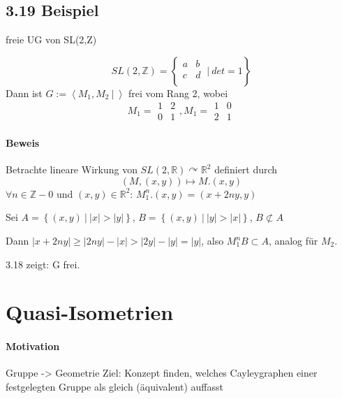 \documentclass{article}
\newcommand{\Z}{\mathbb{Z}}
\newcommand{\R}{\mathbb{R}}
\newcommand{\set}[2]{\left\lbrace #1~|~#2 \right\rbrace}
\newcommand{\grp}[2]{\left\langle #1~|~#2 \right\rangle}
\begin{document}
\subsection{3.19 Beispiel}
freie UG von SL(2,Z)

\[SL(2,\Z) = \set{\begin{matrix}
	a & b\\
	c & d\\
	\end{matrix}}{det = 1}\]
Dann ist $G:= \grp{M_1, M_2}{}$ frei vom Rang 2, wobei 
\[M_1 =\begin{matrix}
1 & 2\\
0 & 1
\end{matrix}, M_1 =\begin{matrix}
1 & 0\\
2 & 1
\end{matrix}\]

\paragraph{Beweis}
Betrachte lineare Wirkung von $SL(2,\R) \curvearrowright \R^2$ definiert durch
\[(M, (x,y)) \longmapsto M.(x,y)\]
$\forall n \in \Z - 0$ und $(x,y) \in \R^2$: $M_1^n.(x,y) = (x+2ny,y)$

Sei $A = \set{(x,y)}{|x| > |y|}$, 
 $B = \set{(x,y)}{|y| > |x|}$,  $B \not \subset A$

Dann $|x + 2ny| \geq |2ny| - |x| > |2y| - |y| = |y|$, also $M_1^nB \subset A$, analog für $M_2$.

3.18 zeigt: G frei.


\section{Quasi-Isometrien}

\paragraph{Motivation}
Gruppe -> Geometrie
Ziel: Konzept finden, welches Cayleygraphen einer festgelegten Gruppe als gleich (äquivalent) auffasst
\end{document}
